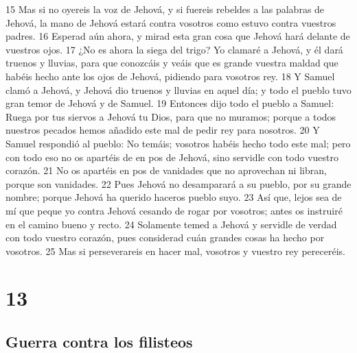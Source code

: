 15 Mas si no oyereis la voz de Jehová, y si fuereis rebeldes a las palabras de Jehová, la mano de Jehová estará contra vosotros como estuvo contra vuestros padres.
16 Esperad aún ahora, y mirad esta gran cosa que Jehová hará delante de vuestros ojos.
17 ¿No es ahora la siega del trigo? Yo clamaré a Jehová, y él dará truenos y lluvias, para que conozcáis y veáis que es grande vuestra maldad que habéis hecho ante los ojos de Jehová, pidiendo para vosotros rey.
18 Y Samuel clamó a Jehová, y Jehová dio truenos y lluvias en aquel día; y todo el pueblo tuvo gran temor de Jehová y de Samuel.
19 Entonces dijo todo el pueblo a Samuel: Ruega por tus siervos a Jehová tu Dios, para que no muramos; porque a todos nuestros pecados hemos añadido este mal de pedir rey para nosotros.
20 Y Samuel respondió al pueblo: No temáis; vosotros habéis hecho todo este mal; pero con todo eso no os apartéis de en pos de Jehová, sino servidle con todo vuestro corazón.
21 No os apartéis en pos de vanidades que no aprovechan ni libran, porque son vanidades.
22 Pues Jehová no desamparará a su pueblo, por su grande nombre; porque Jehová ha querido haceros pueblo suyo.
23 Así que, lejos sea de mí que peque yo contra Jehová cesando de rogar por vosotros; antes os instruiré en el camino bueno y recto.
24 Solamente temed a Jehová y servidle de verdad con todo vuestro corazón, pues considerad cuán grandes cosas ha hecho por vosotros.
25 Mas si perseverareis en hacer mal, vosotros y vuestro rey pereceréis.

\chapter{13}

\section*{Guerra contra los filisteos}

